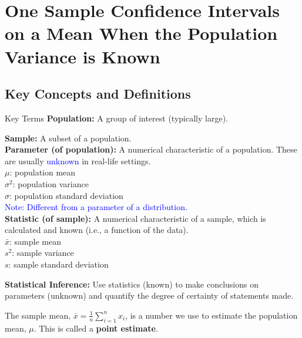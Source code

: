 \chapter{One Sample Confidence Intervals on a Mean When the Population Variance is Known}
\section{Key Concepts and Definitions}

\begin{definitionbox}{Key Terms}
\textbf{Population:} A group of interest (typically large). \\
\vspace{0.2em}

\textbf{Sample:} A subset of a population. \\

\textbf{Parameter (of population):} A numerical characteristic of a population. These are usually \textcolor{blue}{unknown} in real-life settings. \\
\hspace*{1em} $\mu$: population mean \\
\hspace*{1em} $\sigma^2$: population variance \\
\hspace*{1em} $\sigma$: population standard deviation \\
\textcolor{blue}{Note: Different from a parameter of a distribution.} \\

\textbf{Statistic (of sample):} A numerical characteristic of a sample, which is calculated and known (i.e., a function of the data). \\
\hspace*{1em} $\bar{x}$: sample mean \\
\hspace*{1em} $s^2$: sample variance \\
\hspace*{1em} $s$: sample standard deviation\\
\vspace{0.2em}

\textbf{Statistical Inference:} Use statistics (known) to make conclusions on parameters (unknown) and quantify the degree of certainty of statements made.

\end{definitionbox}
\noindent
The sample mean, $\bar{x} = \frac{1}{n} \sum_{i=1}^{n} x_i$, is a number we use to estimate the population mean, $\mu$. This is called a \textbf{point estimate}. %

